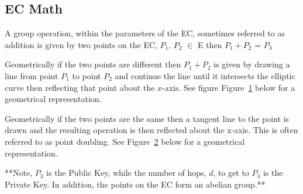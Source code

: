 \subsection{EC Math} A group operation, within the parameters of the EC, sometimes referred to as addition is given by two points on the EC, $P_1$, $P_2$ $\in$ E then $P_1 + P_2$ = $P_3$

Geometrically if the two points are different then $P_1 + P_2$ is given by drawing a line from point $P_1$ to point $P_2$ and continue the line until it intersects the elliptic curve then reflecting that point about the $x$-axis.  See figure Figure~\ref{fig:DH:DHKE_6} below for a geometrical representation.
\begin{figure}[H]
	  \caption{\label{fig:DH:DHKE_6} }
\end{figure}
Geometrically if the two points are the same then a tangent line to the point is drawn and the resulting operation is then reflected about the x-axis.  This is often referred to as point doubling. See Figure~\ref{fig:DH:DHKE_7} below for a geometrical representation.
\begin{figure}[H]
	  \caption{\label{fig:DH:DHKE_7} }
\end{figure}
**Note, $P_3$ is the Public Key, while the number of hops, $d$, to get to $P_3$ is the Private Key.  In addition, the points on the EC form an abelian group.**

